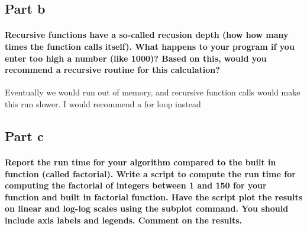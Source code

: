 \documentclass{article}
\begin{document}
    \subsection{Part b}



    \paragraph{Recursive functions have a so-called recusion depth (how how many times
the function calls itself). What happens to your program if you enter
too high a number (like 1000)? Based on this, would you recommend a
recursive routine for this calculation?}


    Eventually we would run out of memory, and recursive function calls
would make this run slower. I would recommend a for loop instead


    \subsection{Part c}



    \paragraph{Report the run time for your algorithm compared to the built in function
(called factorial). Write a script to compute the run time for computing
the factorial of integers between 1 and 150 for your function and built
in factorial function. Have the script plot the results on linear and
log-log scales using the subplot command. You should include axis labels
and legends. Comment on the results.}
\end{document}
